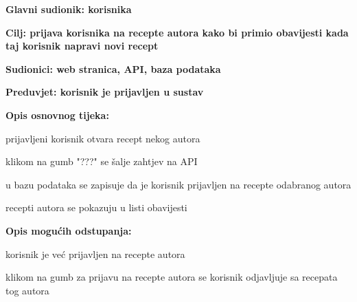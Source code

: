 					\noindent {}
					\begin{packed_item}
						\item \textbf{Glavni sudionik: korisnika}
						\item  \textbf{Cilj: prijava korisnika na recepte autora kako bi primio obavijesti kada taj korisnik napravi novi recept}
						\item  \textbf{Sudionici: web stranica, API, baza podataka}
						\item  \textbf{Preduvjet: korisnik je prijavljen u sustav}
						
						\item  \textbf{Opis osnovnog tijeka:}
						\item[] \begin{packed_enum}
							\item prijavljeni korisnik otvara recept nekog autora
							\item klikom na gumb "???" se šalje zahtjev na API
							\item u bazu podataka se zapisuje da je korisnik prijavljen na recepte odabranog autora
							\item recepti autora se pokazuju u listi obavijesti
						\end{packed_enum}
						
						\item  \textbf{Opis mogućih odstupanja:}
						\item[] \begin{packed_item}							
							\item[8.a] korisnik je već prijavljen na recepte autora
							\begin{packed_enum}
								\item klikom na gumb za prijavu na recepte autora se korisnik odjavljuje sa recepata tog autora
							\end{packed_enum}
						\end{packed_item}
					\end{packed_item}
				
				
				
